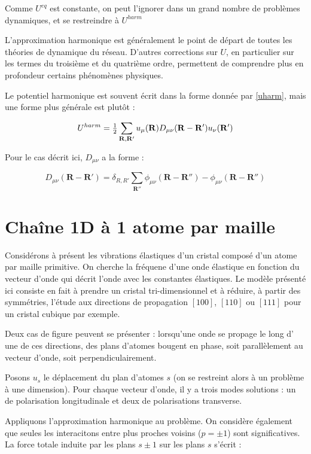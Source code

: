 Comme $U^{eq}$ est constante, on peut l'ignorer dans un grand nombre de
problèmes dynamiques, et se restreindre à $U^{harm}$

L'approximation harmonique est généralement le point de départ de toutes les
théories de dynamique du réseau. D'autres corrections sur $U$, en particulier
sur les termes du troisième et du quatrième ordre, permettent de comprendre
plus en profondeur certains phénomènes physiques.

Le potentiel harmonique est souvent écrit dans la forme donnée par \ref{uharm},
mais une forme plus générale est plutôt :

\begin{equation}
    U^{harm} = \mbox{$\frac{1}{2}$} \sum_{\mathbf{R,R'}} u_\mu(\mathbf{R}) D_{\mu\nu} (\mathbf{R-R'})u_\nu(\mathbf{R'})
\end{equation}

Pour le cas décrit ici, $D_{\mu\nu}$ a la forme :

\begin{equation}
    D_{\mu\nu}(\mathbf{R-R'}) = \delta_{R,R'} \sum_{\mathbf{R''}} \phi_{\mu\nu}(\mathbf{R-R''}) - \phi_{\mu\nu} (\mathbf{R-R''})
\end{equation}

\section{Chaîne 1D à 1 atome par maille}

Considérons à présent les vibrations élastiques d'un cristal composé d'un atome
par maille primitive. On cherche la fréquene d'une onde élastique en fonction du
vecteur d'onde qui décrit l'onde avec les constantes élastiques.
Le modèle présenté ici consiste en fait à prendre un cristal tri-dimensionnel et
à réduire, à partir des symmétries, l'étude aux directions de propagation $[100]$, $[110]$ ou $[111]$ pour un cristal cubique par exemple.

Deux cas de figure peuvent se présenter : lorsqu'une onde se propage le long d'
une de ces directions, des plans d'atomes bougent en phase, soit parallèlement
au vecteur d'onde, soit perpendiculairement.

Posons $u_s$ le déplacement du plan d'atomes $s$ (on se restreint alors à un
problème à une dimension).
Pour chaque vecteur d'onde, il y a trois modes solutions : un de polarisation
longitudinale et deux de polarisations transverse.

Appliquons l'approximation harmonique au problème. On considère également que
seules les interacitons entre plus proches voisins ($p=\pm 1$) sont
significatives. La force totale induite par les plans $s\pm 1$ sur les plans $s$
s'écrit :

